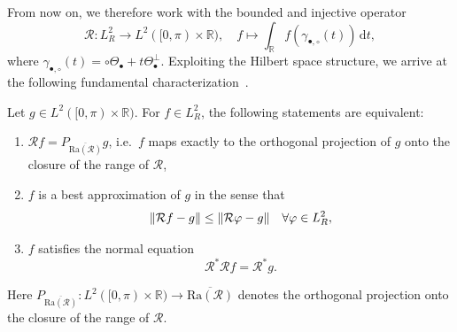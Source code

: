 \documentclass[12pt,a4paper]{article}
\begin{document}
\medskip

From now on, we therefore work with the bounded and injective operator
\[
    \mathcal{R} : L^2_R \longrightarrow L^2([0,\pi) \times \mathbb{R}), 
    \quad f \mapsto \int_{\mathbb R} f(\gamma_{\bullet,\circ}(t))\, \mathrm{d}t,
\]
where $\gamma_{\bullet,\circ}(t) = \circ \Theta_\bullet + t \Theta_\bullet^\perp$.  
Exploiting the Hilbert space structure, we arrive at the following fundamental characterization~\cite{math_of_ct_wald}.

\begin{theorem}
\label{moore:th}
    Let $g \in L^2([0,\pi) \times \mathbb{R})$. For $f \in L^2_R$, the following statements are equivalent:
    \begin{enumerate}
        \item $\mathcal{R} f = P_{\overline{\mathrm{Ra}(\mathcal{R})}} g$, i.e.\ $f$ maps exactly to the orthogonal projection of $g$ onto the closure of the range of $\mathcal{R}$,
        \item $f$ is a best approximation of $g$ in the sense that
        \[
            \norm{\mathcal{R} f - g} \leq \norm{\mathcal{R} \varphi - g}
            \quad \forall \varphi \in L^2_R,
        \]
        \item $f$ satisfies the normal equation
        \[
            \mathcal{R}^* \mathcal{R} f = \mathcal{R}^* g.
        \]
    \end{enumerate}
    Here $P_{\overline{\mathrm{Ra}(\mathcal{R})}} : L^2([0, \pi) \times \mathbb{R}) \to \overline{\mathrm{Ra}(\mathcal{R})}$ denotes the orthogonal projection onto the closure of the range of $\mathcal{R}$.
\end{theorem}
\end{document}

